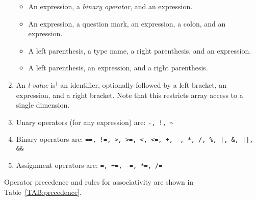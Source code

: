 \documentclass{article}
\newcommand{\isextra}{is$^\ddagger$ }
\begin{document}
\begin{enumerate}
\begin{itemize}
    \item An expression, a \emph{binary operator}, and an expression.

    \item An expression, a question mark, an expression, a colon,
    and an expression.

    \item A left parenthesis, a type name, a right parenthesis, and
    an expression.
    \item A left parenthesis, an expression, and a right parenthesis.
  \end{itemize}

\item \label{lvalue}
  An \emph{l-value} \isextra an identifier,
  optionally followed by a left bracket,
  an expression, and a right bracket.
  Note that this restricts array access to a single dimension.

\item
  Unary operators (for any expression) are: \verb|-, !, ~|

\item
  Binary operators are: \verb$==, !=, >, >=, <, <=, +, -, *, /, %, |, &, ||, &&$

\item
  Assignment operators are: \verb$=, +=, -=, *=, /=$
\end{enumerate}
%
%
Operator precedence and rules for associativity
are shown in Table~\ref{TAB:precedence}.
%
\end{document}
